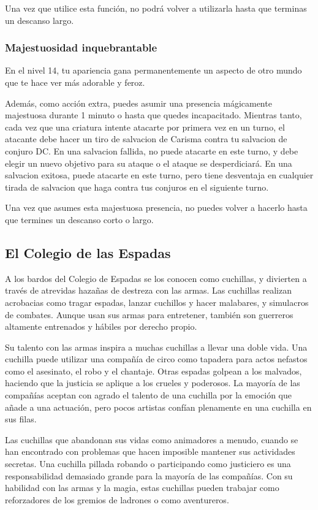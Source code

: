 \documentclass[a4paper,twocolumn,openany,10pt]{dndbook}
\begin{document}
Una vez que utilice esta función, no podrá volver a utilizarla hasta que terminas un descanso largo. 

\subsubsection{Majestuosidad inquebrantable}
En el nivel 14, tu apariencia gana permanentemente un aspecto de otro mundo que te hace ver más adorable y feroz.

Además, como acción extra, puedes asumir una presencia mágicamente majestuosa durante 1 minuto o hasta que quedes incapacitado. Mientras
tanto, cada vez que una criatura intente atacarte por primera vez en un turno, el atacante debe hacer un tiro de salvacion de Carisma contra
tu salvacion de conjuro DC. En una salvacion fallida, no puede atacarte en este turno, y debe elegir un nuevo objetivo para su ataque o el
ataque se desperdiciará. En una salvacion exitosa, puede atacarte en este turno, pero tiene desventaja en cualquier tirada de salvacion que
haga contra tus conjuros en el siguiente turno.

Una vez que asumes esta majestuosa presencia, no puedes volver a hacerlo hasta que termines un descanso corto o largo.


\subsection{El Colegio de las Espadas}

A los bardos del Colegio de Espadas se los conocen como cuchillas, y divierten a través de atrevidas hazañas de destreza con las armas.
Las cuchillas realizan acrobacias como tragar espadas, lanzar cuchillos y hacer malabares, y simulacros de combates. Aunque usan sus armas
para entretener, también son guerreros altamente entrenados y hábiles por derecho propio.

Su talento con las armas inspira a muchas cuchillas a llevar una doble vida. Una cuchilla puede utilizar una compañía de circo como tapadera
para actos nefastos como el asesinato, el robo y el chantaje. Otras espadas golpean a los malvados, haciendo que la justicia se aplique a los
crueles y poderosos. La mayoría de las compañías aceptan con agrado el talento de una cuchilla por la emoción que añade a una actuación, pero
pocos artistas confían plenamente en una cuchilla en sus filas.

Las cuchillas que abandonan sus vidas como animadores a menudo, cuando se han encontrado con problemas que hacen imposible mantener sus
actividades secretas. Una cuchilla pillada robando o participando como justiciero es una responsabilidad demasiado grande para la mayoría de
las compañías. Con su habilidad con las armas y la magia, estas cuchillas pueden trabajar como reforzadores de los gremios de ladrones o como
aventureros.  
\end{document}
